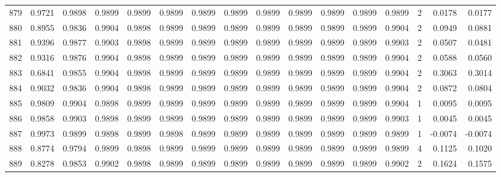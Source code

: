\begin{tabular}{lrrrrrrrrrrrrrrr}
879 &      0.9721 &  0.9898 &  0.9899 &  0.9899 &  0.9899 &  0.9899 &  0.9899 &  0.9899 &  0.9899 &  0.9899 &   0.9899 &     0.9899 &      2 &                    0.0178 &                     0.0177 \\
880 &      0.8955 &  0.9836 &  0.9904 &  0.9898 &  0.9899 &  0.9899 &  0.9899 &  0.9899 &  0.9899 &  0.9899 &   0.9899 &     0.9904 &      2 &                    0.0949 &                     0.0881 \\
881 &      0.9396 &  0.9877 &  0.9903 &  0.9898 &  0.9899 &  0.9899 &  0.9899 &  0.9899 &  0.9899 &  0.9899 &   0.9899 &     0.9903 &      2 &                    0.0507 &                     0.0481 \\
882 &      0.9316 &  0.9876 &  0.9904 &  0.9898 &  0.9899 &  0.9899 &  0.9899 &  0.9899 &  0.9899 &  0.9899 &   0.9899 &     0.9904 &      2 &                    0.0588 &                     0.0560 \\
883 &      0.6841 &  0.9855 &  0.9904 &  0.9898 &  0.9899 &  0.9899 &  0.9899 &  0.9899 &  0.9899 &  0.9899 &   0.9899 &     0.9904 &      2 &                    0.3063 &                     0.3014 \\
884 &      0.9032 &  0.9836 &  0.9904 &  0.9898 &  0.9899 &  0.9899 &  0.9899 &  0.9899 &  0.9899 &  0.9899 &   0.9899 &     0.9904 &      2 &                    0.0872 &                     0.0804 \\
885 &      0.9809 &  0.9904 &  0.9898 &  0.9899 &  0.9899 &  0.9899 &  0.9899 &  0.9899 &  0.9899 &  0.9899 &   0.9899 &     0.9904 &      1 &                    0.0095 &                     0.0095 \\
886 &      0.9858 &  0.9903 &  0.9898 &  0.9899 &  0.9899 &  0.9899 &  0.9899 &  0.9899 &  0.9899 &  0.9899 &   0.9899 &     0.9903 &      1 &                    0.0045 &                     0.0045 \\
887 &      0.9973 &  0.9899 &  0.9898 &  0.9899 &  0.9898 &  0.9899 &  0.9899 &  0.9899 &  0.9899 &  0.9899 &   0.9899 &     0.9899 &      1 &                   -0.0074 &                    -0.0074 \\
888 &      0.8774 &  0.9794 &  0.9899 &  0.9898 &  0.9899 &  0.9899 &  0.9899 &  0.9899 &  0.9899 &  0.9899 &   0.9899 &     0.9899 &      4 &                    0.1125 &                     0.1020 \\
889 &      0.8278 &  0.9853 &  0.9902 &  0.9898 &  0.9899 &  0.9899 &  0.9899 &  0.9899 &  0.9899 &  0.9899 &   0.9899 &     0.9902 &      2 &                    0.1624 &                     0.1575 \\

\end{tabular}
